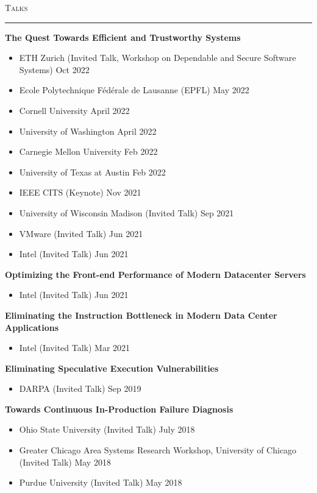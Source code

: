 \documentclass[10pt]{article}
\newcommand{\mysec}[1]{\vspace{2em}\textsc{\large #1}\vspace{1mm}\hrule\vspace{2mm}}
\newcommand{\mysub}[3]{\textbf{#1} {#2} \hfill {\em #3}}
\begin{document}
\mysec{Talks}
\mysub{The Quest Towards Efficient and Trustworthy Systems}{}{}
\vspace{-2mm}
\begin{itemize}
  \setlength\itemsep{0em}
\item{ETH Zurich (Invited Talk, Workshop on Dependable and Secure Software Systems)} \hfill Oct 2022
\item{Ecole Polytechnique F\'ed\'erale de Lausanne (EPFL)} \hfill May 2022
\item{Cornell University} \hfill April 2022
\item{University of Washington} \hfill April 2022
\item{Carnegie Mellon University} \hfill Feb 2022
\item{University of Texas at Austin} \hfill Feb 2022
\item{IEEE CITS (Keynote)} \hfill Nov 2021
\item{University of Wisconsin Madison (Invited Talk)} \hfill Sep 2021
\item{VMware (Invited Talk)} \hfill Jun 2021
\item{Intel (Invited Talk)} \hfill Jun 2021
\end{itemize}
\mysub{Optimizing the Front-end Performance of Modern Datacenter Servers}{}{}
\vspace{-2mm}
\begin{itemize}
  \setlength\itemsep{0em}
\item{Intel (Invited Talk)} \hfill Jun 2021
\end{itemize}
\mysub{Eliminating the Instruction Bottleneck in Modern Data Center Applications}{}{}
\vspace{-2mm}
\begin{itemize}
  \setlength\itemsep{0em}
\item{Intel (Invited Talk)} \hfill Mar 2021
\end{itemize}
\mysub{Eliminating Speculative Execution Vulnerabilities}{}{}
\vspace{-2mm}
\begin{itemize}
  \setlength\itemsep{0em}
\item{DARPA (Invited Talk)} \hfill Sep 2019
\end{itemize}
\mysub{Towards Continuous In-Production Failure Diagnosis}{}{}
\vspace{-2mm}
\begin{itemize}
  \setlength\itemsep{0em}
\item{Ohio State University (Invited Talk)} \hfill July 2018
\item{Greater Chicago Area Systems Research Workshop, University of Chicago (Invited Talk)} \hfill May 2018
\item{Purdue University (Invited Talk)} \hfill May 2018
\end{itemize}
\end{document}
